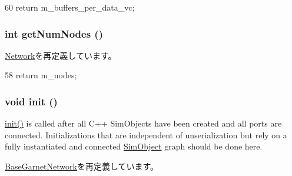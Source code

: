 \begin{DoxyCode}
60 {return m_buffers_per_data_vc; }
\end{DoxyCode}
\hypertarget{classGarnetNetwork__d_a52ab76ba6f0a40a06c6fc4043351824e}{
\subsubsection[{getNumNodes}]{\setlength{\rightskip}{0pt plus 5cm}int getNumNodes ()}}
\label{classGarnetNetwork__d_a52ab76ba6f0a40a06c6fc4043351824e}


\hyperlink{classNetwork_a7624554588ea569f360d6ea8e1cad409}{Network}を再定義しています。


\begin{DoxyCode}
58 { return m_nodes; }
\end{DoxyCode}
\hypertarget{classGarnetNetwork__d_a02fd73d861ef2e4aabb38c0c9ff82947}{
\subsubsection[{init}]{\setlength{\rightskip}{0pt plus 5cm}void init ()}}
\label{classGarnetNetwork__d_a02fd73d861ef2e4aabb38c0c9ff82947}
\hyperlink{classGarnetNetwork__d_a02fd73d861ef2e4aabb38c0c9ff82947}{init()} is called after all C++ SimObjects have been created and all ports are connected. Initializations that are independent of unserialization but rely on a fully instantiated and connected \hyperlink{classSimObject}{SimObject} graph should be done here. 

\hyperlink{classBaseGarnetNetwork_a02fd73d861ef2e4aabb38c0c9ff82947}{BaseGarnetNetwork}を再定義しています。


